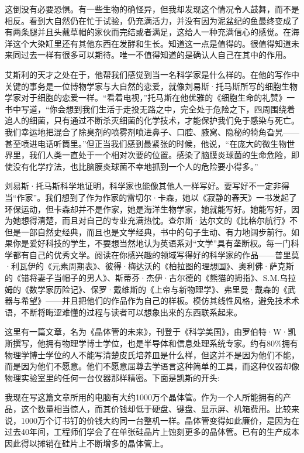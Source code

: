 这倒没有必要恐惧。有一些生物的确怪异，但我却发现这个情况令人鼓舞，而不是相反。看到大自然仍在忙于试验，仍充满活力，并没有因为泥盆纪的鱼最终变成了有两条腿并且头戴草帽的家伙而完结或者满足，这给人一种充满信心的感觉。在海洋这个大染缸里还有其他东西在发酵和生长。知道这一点是值得的。很值得知道未来同过去一样有很多可以期待。唯一不值得知道的是确认人自己在其中的作用。

艾斯利的天才之处在于，他帮我们感觉到当一名科学家是什么样的。在他的写作中关键的事务是一位博物学家与大自然的恋爱，就像刘易斯·托马斯所写的细胞生物学家对于细胞的恋爱一样。“看着电视，”托马斯在他优雅的《细胞生命的礼赞》一书中写道，“你会想到我们生活于走投无路之中，完全处于危险之下，四周围绕着追人的细菌，只有通过不断杀灭细菌的化学技术，才能保护我们免于感染与死亡。我们幸运地把混合了除臭剂的喷雾剂喷进鼻子、口腔、腋窝、隐秘的犄角旮旯——甚至喷进电话听筒里。”但正当我们感到最紧张的时候，他说，“在庞大的微生物世界里，我们人类一直处于一个相对次要的位置。感染了脑膜炎球菌的生命危险，即使没有化学疗法，也比脑膜炎球菌不幸地抓到一个人的危险要小得多。”

刘易斯·托马斯科学地证明，科学家也能像其他人一样写好。要写好不一定非得当“作家”。我们想到了作为作家的雷切尔·卡森，她以《寂静的春天》一书发起了环保运动，但卡森却并不是作家，她是海洋生物学家，她就能写好。她能写好，因为她想得清楚，而且对自己的专业充满热忱。查尔斯·达尔文的《比格尔航行》不但是一部自然史经典，而且也是文学经典，书中的句子生动、有力地阔步前行。如果你是爱好科技的学生，不要想当然地认为英语系对“文学”具有垄断权。每一门科学都有自己的优秀文学。阅读在你感兴趣的领域写得好的科学家的作品——普里莫·利瓦伊的《元素周期表》、彼得·梅达沃的《柏拉图的理想国》、奥利佛·萨克斯的《错将妻子当帽子的男人》、斯蒂芬·杰伊·古尔德的《熊猫的拇指》、S.M.乌拉姆的《数学家历险记》、保罗·戴维斯的《上帝与新物理学》、弗里曼·戴森的《武器与希望》——并且把他们的作品作为自己的样板。模仿其线性风格，避免技术术语，不断将晦涩难懂的过程与读者可以想象出来的东西联系起来。

这里有一篇文章，名为《晶体管的未来》，刊登于《科学美国》，由罗伯特·W·凯斯撰写，他拥有物理学博士学位，也是半导体和信息处理系统专家。约有80\%拥有物理学博士学位的人不能写清楚皮氏培养皿是什么样，但这并不是因为他们不能，而是因为他们不愿意。他们不愿意屈尊去学语言这种简单的工具，而这种仪器却像物理实验室里的任何一台仪器那样精密。下面是凯斯的开头:

我现在写这篇文章所用的电脑有大约1000万个晶体管。作为一个人所能拥有的产品，这个数量相当惊人，而其价钱却低于硬盘、键盘、显示屏、机箱费用。比较来说，1000万个订书钉的价钱大约同一台整机一样。晶体管变得如此廉价，是因为在过去40年间，工程师们学会了在单张硅晶片上蚀刻更多的晶体管。已有的生产成本因此得以摊销在硅片上不断增多的晶体管上。

